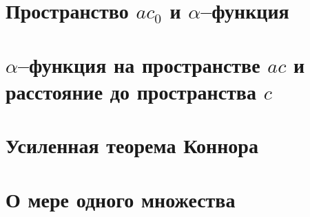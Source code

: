 \documentclass[a4paper,openbib]{report}
\theoremstyle{definition}
\begin{document}
	\section{Пространство $ac_0$ и $\alpha$--функция}
	

	\section{$\alpha$--функция на пространстве $ac$ и расстояние до пространства $c$}
	

	\section{Усиленная теорема Коннора}
	

	\section{О мере одного множества}
	





%	
\end{document}
